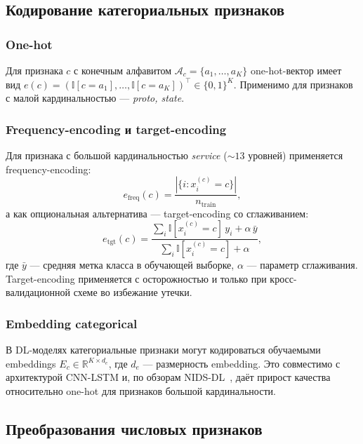 \subsection{Кодирование категориальных признаков}

\subsubsection{One-hot}

Для признака \(c\) с конечным алфавитом \(\mathcal{A}_c =
\{a_1, \dots, a_K\}\) one-hot-вектор имеет вид
\(e(c) = (\mathbb{I}[c=a_1], \dots, \mathbb{I}[c=a_K])^\top \in \{0,1\}^K\).
Применимо для признаков с малой кардинальностью --- \emph{proto, state}.

\subsubsection{Frequency-encoding и target-encoding}

Для признака с большой кардинальностью \emph{service}
(\(\sim 13\) уровней) применяется frequency-encoding:
\begin{equation}
e_{\text{freq}}(c) = \frac{|\{i : x_i^{(c)} = c\}|}{n_{\text{train}}},
\label{eq:freq-enc}
\end{equation}
а как опциональная альтернатива --- target-encoding со сглаживанием:
\begin{equation}
e_{\text{tgt}}(c) =
\frac{\sum_i \mathbb{I}[x_i^{(c)}=c]\,y_i + \alpha\,\bar{y}}
     {\sum_i \mathbb{I}[x_i^{(c)}=c] + \alpha},
\label{eq:tgt-enc}
\end{equation}
где \(\bar{y}\) --- средняя метка класса в обучающей выборке, \(\alpha\) ---
параметр сглаживания. Target-encoding применяется с осторожностью и только
при кросс-валидационной схеме во избежание утечки.

\subsubsection{Embedding categorical}

В DL-моделях категориальные признаки могут кодироваться обучаемыми
embeddings \(E_c \in \mathbb{R}^{K \times d_e}\), где \(d_e\) --- размерность
embedding. Это совместимо с архитектурой CNN-LSTM и, по обзорам
NIDS-DL~\cite{ferrag2020dlcyber, ahmad2021nids}, даёт прирост качества
относительно one-hot для признаков большой кардинальности.

\subsection{Преобразования числовых признаков}

